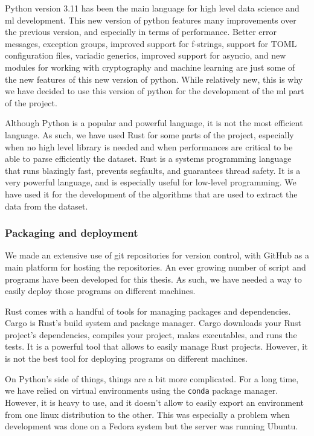    Python version 3.11 has been the main language for high level data science and \acrshort{ml} development. This new version of python features many improvements over the previous version, and especially in terms of performance. Better error messages, exception groups, improved support for f-strings, support for TOML configuration files, variadic generics, improved support for asyncio, and new modules for working with cryptography and machine learning are just some of the new features of this new version of python. While relatively new, this is why we have decided to use this version of python for the development of the \acrshort{ml} part of the project.

    Although Python is a popular and powerful language, it is not the most efficient language. As such, we have used Rust for some parts of the project, especially when no high level library is needed and when performances are critical to be able to parse efficiently the dataset. Rust is a systems programming language that runs blazingly fast, prevents segfaults, and guarantees thread safety. It is a very powerful language, and is especially useful for low-level programming. We have used it for the development of the algorithms that are used to extract the data from the dataset.

    \subsubsection{Packaging and deployment}
    We made an extensive use of git repositories for version control, with GitHub as a main platform for hosting the repositories. An ever growing number of script and programs have been developed for this thesis. As such, we have needed a way to easily deploy those programs on different machines.

    Rust comes with a handful of tools for managing packages and dependencies. Cargo is Rust's build system and package manager. Cargo downloads your Rust project's dependencies, compiles your project, makes executables, and runs the tests. It is a powerful tool that allows to easily manage Rust projects. However, it is not the best tool for deploying programs on different machines. 

    On Python's side of things, things are a bit more complicated. For a long time, we have relied on virtual environments using the \texttt{conda} package manager. However, it is heavy to use, and it doesn't allow to easily export an environment from one linux distribution to the other. This was especially a problem when development was done on a Fedora system but the server was running Ubuntu. 

